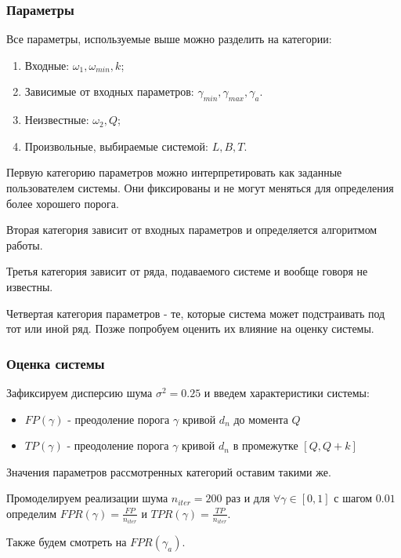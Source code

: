 \documentclass[11pt]{beamer}
\begin{document}
	\begin{frame}
		\frametitle{Параметры}
		Все параметры, используемые выше можно разделить на категории: 
		\begin{enumerate}
			\item Входные: $ \omega_1, \omega_{min}, k$;
			\item Зависимые от входных параметров: $ \gamma_{min}, \gamma_{max}, \gamma_a $.
			\item Неизвестные: $ \omega_2, Q $;
			\item Произвольные, выбираемые системой: $ L, B, T $.
			
		\end{enumerate}
		
		Первую категорию параметров можно интерпретировать как заданные пользователем системы. Они фиксированы и не могут меняться для определения более хорошего порога.
		
		\bigskip
		
		Вторая категория зависит от входных параметров и определяется алгоритмом работы.
				
		\bigskip
		
		Третья категория зависит от ряда, подаваемого системе и вообще говоря не известны.
		
		\bigskip
		
		Четвертая категория параметров - те, которые система может подстраивать под тот или иной ряд. Позже попробуем оценить их влияние на оценку системы.
	\end{frame}
	
	
	
	\begin{frame}
		\frametitle{Оценка системы}
		Зафиксируем дисперсию шума $ \sigma^2 = 0.25 $ и введем характеристики системы:
		
		\begin{itemize}
			\item $ FP(\gamma) $ - преодоление порога $ \gamma $ кривой $ d_n $ до момента $ Q $
			\item $ TP(\gamma) $ - преодоление порога $ \gamma $ кривой $ d_n $ в промежутке $ [Q, Q+k] $
		\end{itemize}
		
		Значения параметров рассмотренных категорий оставим такими же. 
		
		\bigskip
		
		Промоделируем реализации шума $ n_{iter} = 200 $ раз и для $ \forall \gamma \in [0, 1] $ с шагом $ 0.01 $ определим $ FPR(\gamma) = \frac{FP}{n_{iter}} $ и $ TPR(\gamma) = \frac{TP}{n_{iter}} $.
		
		Также будем смотреть на $ FPR(\gamma_a) $.
		
	\end{frame}
	
\end{document}
